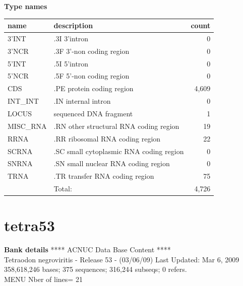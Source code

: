 \documentclass{article}
\begin{document}
\begin{Schunk}
\textbf{Type names}
\noindent\begin{tabular}{llr}
\hline \hline
name & description & count \\
\hline
3'INT  &  .3I 3'intron  &  0 \\
3'NCR  &  .3F  3'-non coding region  &  0 \\
5'INT  &  .5I 5'intron  &  0 \\
5'NCR  &  .5F  5'-non coding region  &  0 \\
CDS  &  .PE protein coding region  &  4,609 \\
INT\_INT  &  .IN  internal intron  &  0 \\
LOCUS  &  sequenced DNA fragment  &  1 \\
MISC\_RNA  &  .RN other structural RNA coding region  &  19 \\
RRNA  &  .RR ribosomal RNA coding region  &  22 \\
SCRNA  &  .SC small cytoplasmic RNA coding region  &  0 \\
SNRNA  &  .SN small nuclear RNA coding region  &  0 \\
TRNA  &  .TR transfer RNA coding region  &  75 \\
\hline
 & Total: & 4,726 \\
\hline \hline
\end{tabular}

\section{ tetra53 }
\textbf{Bank details}
             ****     ACNUC Data Base Content      ****                         \\
   Tetraodon negroviritis - Release 53 - (03/06/09) Last Updated: Mar  6, 2009\\
358,618,246 bases; 375 sequences; 316,244 subseqs; 0 refers.\\
MENU Nber of lines= 21                                                         


\end{Schunk}
\end{document}
